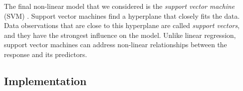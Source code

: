 \documentclass{article}
\begin{document}

	The final non-linear model that we considered is the \textit{support vector machine} (SVM) \cite{cortes1995support, drucker1997support}. Support vector machines find a hyperplane that closely fits the data. Data observations that are close to this hyperplane are called \textit{support vectors}, and they have the strongest influence on the model. Unlike linear regression, support vector machines can address non-linear relationships between the response and its predictors. 
	
	
	\subsection{Implementation}
	
\end{document}
